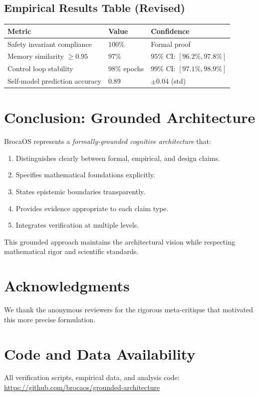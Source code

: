 \documentclass[12pt]{article}
\theoremstyle{definition}
\begin{document}
\subsection{Empirical Results Table (Revised)}

\begin{center}
\begin{tabular}{|l|l|l|}
\hline
\textbf{Metric} & \textbf{Value} & \textbf{Confidence} \\
\hline
Safety invariant compliance & 100\% & Formal proof \\
Memory similarity $\geq 0.95$ & 97\% & $95\%$ CI: $[96.2\%, 97.8\%]$ \\
Control loop stability & 98\% epochs & $99\%$ CI: $[97.1\%, 98.9\%]$ \\
Self-model prediction accuracy & 0.89 & $\pm 0.04$ (std) \\
\hline
\end{tabular}
\end{center}

\section{Conclusion: Grounded Architecture}

BrocaOS represents a \emph{formally-grounded cognitive architecture} that:

\begin{enumerate}
    \item Distinguishes clearly between formal, empirical, and design claims.
    \item Specifies mathematical foundations explicitly.
    \item States epistemic boundaries transparently.
    \item Provides evidence appropriate to each claim type.
    \item Integrates verification at multiple levels.
\end{enumerate}

This grounded approach maintains the architectural vision while respecting mathematical rigor and scientific standards.

\section*{Acknowledgments}

We thank the anonymous reviewers for the rigorous meta-critique that motivated this more precise formulation.

\section*{Code and Data Availability}

All verification scripts, empirical data, and analysis code:\\
\url{https://github.com/brocaos/grounded-architecture}
\end{document}

